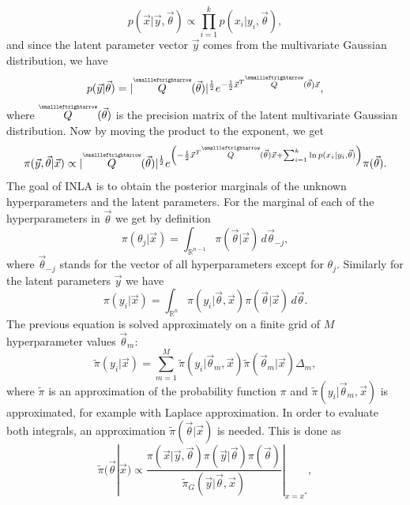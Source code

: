 \begin{equation}
    p(\vec{x}|\vec{y}, \vec{\theta}) \propto \prod_{i=1}^{k}p(x_i|y_i, \vec{\theta}),
\end{equation}
and since the latent parameter vector $\vec{y}$ comes from the multivariate Gaussian distribution, we have
\begin{equation}
    p(\vec{y}|\vec{\theta}) = |\tensor{Q}(\vec{\theta})|^{\frac{1}{2}} e^{-\frac{1}{2} \vec{x}^T \tensor{Q}(\vec{\theta}) \vec{x} },
\end{equation}
where $\tensor{Q}(\vec{\theta})$ is the precision matrix of the latent multivariate Gaussian distribution. Now by moving the product to the exponent, we get
\begin{equation}
    \pi(\vec{y}, \vec{\theta}|\vec{x}) \propto |\tensor{Q}(\vec{\theta})|^{\frac{1}{2}} e^{\left(-\frac{1}{2} \vec{x}^T \tensor{Q}(\vec{\theta}) \vec{x} + \sum_{i=1}^{k}\ln{p(x_i|y_i, \vec{\theta})} \right)} \pi(\vec{\theta}).
\end{equation}
The goal of INLA is to obtain the posterior marginals of the unknown hyperparameters and the latent parameters. For the marginal of each of the hyperparameters in $\vec{\theta}$ we get by definition
\begin{equation}
    \pi(\theta_j|\vec{x}) = \int_{\mathbb{R}^{n-1}}\pi(\vec{\theta}|\vec{x}) \, d\vec{\theta}_{-j}, 
\end{equation}
where $\vec{\theta}_{-j}$ stands for the vector of all hyperparameters except for $\theta_j$. Similarly for the latent parameters $\vec{y}$ we have
\begin{equation}
    \pi(y_i|\vec{x}) = \int_{\mathbb{R}^{n}} \pi(y_i|\vec{\theta},\vec{x}) \pi(\vec{\theta}|\vec{x}) \, d\vec{\theta}.
\end{equation}
The previous equation is solved approximately on a finite grid of $M$ hyperparameter values $\vec{\theta}_m$:
\begin{equation}
    \tilde{\pi}(y_i|\vec{x}) = \sum_{m=1}^M \tilde{\pi}(y_i|\vec{\theta}_m,\vec{x}) \tilde{\pi}(\vec{\theta}_m|\vec{x}) \Delta_m,
\end{equation}
where $\tilde{\pi}$ is an approximation of the probability function $\pi$ and $\tilde{\pi}(y_i|\vec{\theta}_m,\vec{x})$ is approximated, for example with Laplace approximation. In order to evaluate both integrals, an approximation $\tilde{\pi}(\vec{\theta}|\vec{x})$ is needed. This is done as 
\begin{equation}
    \tilde{\pi}(\vec{\theta}|\vec{x}) \propto \frac{ \pi(\vec{x}|\vec{y},\vec{\theta}) \pi(\vec{y}|\vec{\theta}) \pi(\vec{\theta})}{\tilde{\pi}_G(\vec{y}|\vec{\theta},\vec{x})}|_{x=x^*},
\end{equation}
